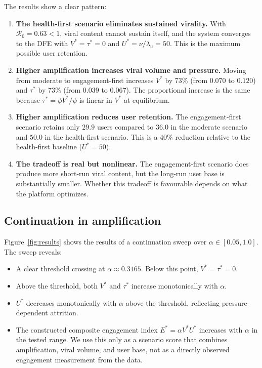 \documentclass[11pt]{article}
\begin{document}
The results show a clear pattern:
\begin{enumerate}[leftmargin=1.5em]
    \item \textbf{The health-first scenario eliminates sustained virality.} With $\mathcal{R}_0 = 0.63 < 1$, viral content cannot sustain itself, and the system converges to the DFE with $V^* = \tau^* = 0$ and $U^* = \nu/\lambda_u = 50$. This is the maximum possible user retention.

    \item \textbf{Higher amplification increases viral volume and pressure.} Moving from moderate to engagement-first increases $V^*$ by 73\% (from $0.070$ to $0.120$) and $\tau^*$ by 73\% (from $0.039$ to $0.067$). The proportional increase is the same because $\tau^* = \phi V^*/\psi$ is linear in $V^*$ at equilibrium.

    \item \textbf{Higher amplification reduces user retention.} The engagement-first scenario retains only $29.9$ users compared to $36.0$ in the moderate scenario and $50.0$ in the health-first scenario. This is a 40\% reduction relative to the health-first baseline ($U^* = 50$).

    \item \textbf{The tradeoff is real but nonlinear.} The engagement-first scenario does produce more short-run viral content, but the long-run user base is substantially smaller. Whether this tradeoff is favourable depends on what the platform optimizes.
\end{enumerate}

\subsection{Continuation in amplification}

Figure~\ref{fig:results} shows the results of a continuation sweep over $\alpha \in [0.05, 1.0]$. The sweep reveals:
\begin{itemize}[leftmargin=1.5em]
    \item A clear threshold crossing at $\alpha \approx 0.3165$. Below this point, $V^* = \tau^* = 0$.
    \item Above the threshold, both $V^*$ and $\tau^*$ increase monotonically with $\alpha$.
    \item $U^*$ decreases monotonically with $\alpha$ above the threshold, reflecting pressure-dependent attrition.
    \item The constructed composite engagement index $E^* = \alpha V^* U^*$ increases with $\alpha$ in the tested range. We use this only as a scenario score that combines amplification, viral volume, and user base, not as a directly observed engagement measurement from the data.
\end{itemize}
\end{document}
